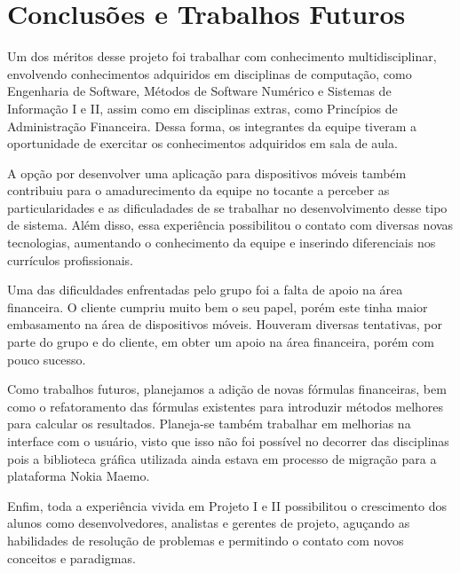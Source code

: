 \chapter{Conclusões e Trabalhos Futuros}

Um dos méritos desse projeto foi trabalhar com conhecimento multidisciplinar, envolvendo 
conhecimentos adquiridos em disciplinas de computação, como Engenharia de Software, Métodos de
Software Numérico e Sistemas de Informação I e II, assim como em disciplinas extras, como
Princípios de Administração Financeira. Dessa forma, os integrantes da equipe tiveram a
oportunidade de exercitar os conhecimentos adquiridos em sala de aula.

A opção por desenvolver uma aplicação para dispositivos móveis também contribuiu para o amadurecimento
da equipe no tocante a perceber as particularidades e as dificuladades de se trabalhar no desenvolvimento desse tipo
de sistema. Além disso, essa experiência possibilitou o contato com diversas novas tecnologias,
aumentando o conhecimento da equipe e inserindo diferenciais nos currículos profissionais.

Uma das dificuldades enfrentadas pelo grupo foi a falta de apoio na área financeira. O cliente
cumpriu muito bem o seu papel, porém este tinha maior embasamento na área de dispositivos móveis.
Houveram diversas tentativas, por parte do grupo e do cliente, em obter um apoio na área financeira,
porém com pouco sucesso.

Como trabalhos futuros, planejamos a adição de novas fórmulas financeiras, bem como o refatoramento
das fórmulas existentes para introduzir métodos melhores para calcular os resultados. Planeja-se
também trabalhar em melhorias na interface com o usuário, visto que isso não foi possível no
decorrer das disciplinas pois a biblioteca gráfica utilizada ainda estava em processo de migração
para a plataforma Nokia Maemo.

Enfim, toda a experiência vivida em Projeto I e II possibilitou o crescimento dos alunos como
desenvolvedores, analistas e gerentes de projeto, aguçando as habilidades de reso\-lução
de problemas e permitindo o contato com novos conceitos e paradigmas.
